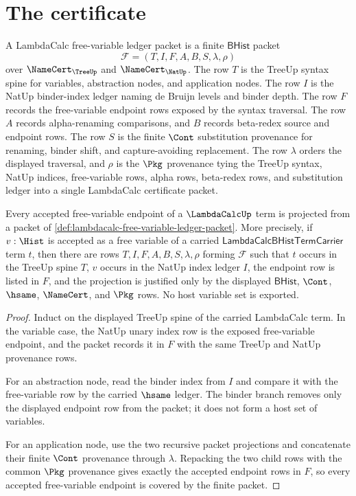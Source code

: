\section{The certificate}
\label{sec:lambdacalc-certificate}

\begin{definition}
\label{def:lambdacalc-free-variable-ledger-packet}
A LambdaCalc free-variable ledger packet is a finite $\mathsf{BHist}$ packet
$$
\mathcal F=(T,I,F,A,B,S,\lambda,\rho)
$$
over $\NameCert_{\TreeUp}$ and $\NameCert_{\NatUp}$. The row $T$ is the
TreeUp syntax spine for variables, abstraction nodes, and application nodes.
The row $I$ is the NatUp binder-index ledger naming de Bruijn levels and binder
depth. The row $F$ records the free-variable endpoint rows exposed by the
syntax traversal. The row $A$ records alpha-renaming comparisons, and $B$
records beta-redex source and endpoint rows. The row $S$ is the finite
$\Cont$ substitution provenance for renaming, binder shift, and
capture-avoiding replacement. The row $\lambda$ orders the displayed traversal,
and $\rho$ is the $\Pkg$ provenance tying the TreeUp syntax, NatUp indices,
free-variable rows, alpha rows, beta-redex rows, and substitution ledger into a
single LambdaCalc certificate packet.
\end{definition}

\begin{theorem}
\label{thm:lambdacalc-free-variable-ledger-coverage}
Every accepted free-variable endpoint of a $\LambdaCalcUp$ term is projected
from a packet of \autoref{def:lambdacalc-free-variable-ledger-packet}. More
precisely, if $v:\Hist$ is accepted as a free variable of a carried
$\mathsf{LambdaCalcBHistTermCarrier}$ term $t$, then there are rows
$T,I,F,A,B,S,\lambda,\rho$ forming $\mathcal F$ such that $t$ occurs in the
TreeUp spine $T$, $v$ occurs in the NatUp index ledger $I$, the endpoint row is
listed in $F$, and the projection is justified only by the displayed
$\mathsf{BHist}$, $\Cont$, $\hsame$, $\NameCert$, and $\Pkg$ rows. No host
variable set is exported.
\end{theorem}
\begin{proof}
Induct on the displayed TreeUp spine of the carried LambdaCalc term. In the
variable case, the NatUp unary index row is the exposed free-variable endpoint,
and the packet records it in $F$ with the same TreeUp and NatUp provenance rows.

For an abstraction node, read the binder index from $I$ and compare it with the
free-variable row by the carried $\hsame$ ledger. The binder branch removes only
the displayed endpoint row from the packet; it does not form a host set of
variables.

For an application node, use the two recursive packet projections and concatenate
their finite $\Cont$ provenance through $\lambda$. Repacking the two child rows
with the common $\Pkg$ provenance gives exactly the accepted endpoint rows in
$F$, so every accepted free-variable endpoint is covered by the finite packet.
\end{proof}

